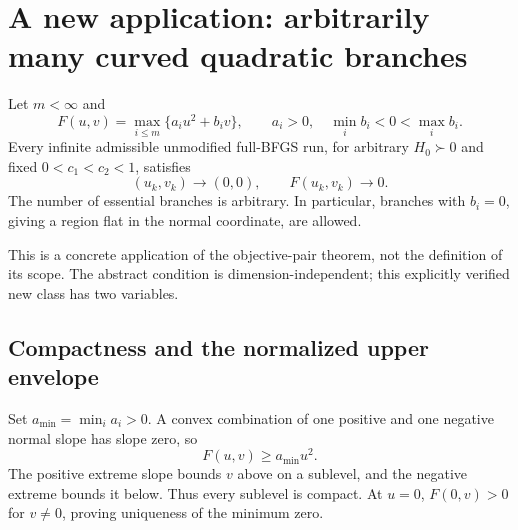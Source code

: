 \begingroup
\providecommand{\R}{}
\renewcommand{\R}{\mathbb R}
\providecommand{\tr}{}
\renewcommand{\tr}{\operatorname{tr}}
\providecommand{\diag}{}
\renewcommand{\diag}{\operatorname{diag}}
\providecommand{\Span}{}
\renewcommand{\Span}{\operatorname{span}}
\providecommand{\ip}{}
\renewcommand{\ip}[2]{\langle #1,#2\rangle}
\providecommand{\norm}{}
\renewcommand{\norm}[1]{\lVert #1\rVert}
\providecommand{\T}{}
\renewcommand{\T}{^{\mathsf T}}
\providecommand{\D}{}
\renewcommand{\D}{\mathcal D}
\setcounter{section}{4}
\setcounter{theorem}{1}
\setcounter{lemma}{0}
\setcounter{corollary}{0}
\setcounter{proposition}{0}
\setcounter{remark}{0}
\setcounter{equation}{6}
\section{A new application: arbitrarily many curved quadratic branches}
\begin{theorem}
Let $m<\infty$ and
\[
 F(u,v)=\max_{i\le m}\{a_i u^2+b_i v\},\qquad
 a_i>0,\quad\min_i b_i<0<\max_i b_i.
\]
Every infinite admissible unmodified full-BFGS run, for arbitrary $H_0\succ0$ and fixed $0<c_1<c_2<1$, satisfies
\[
 (u_k,v_k)\to(0,0),\qquad F(u_k,v_k)\to0.
\]
The number of essential branches is arbitrary. In particular, branches with $b_i=0$, giving a region flat in the normal coordinate, are allowed.
\end{theorem}
This is a concrete application of the objective-pair theorem, not the definition of its scope. The abstract condition is dimension-independent; this explicitly verified new class has two variables.

\subsection{Compactness and the normalized upper envelope}
Set $a_{\min}=\min_i a_i>0$. A convex combination of one positive and one negative normal slope has slope zero, so
\[
 F(u,v)\ge a_{\min}u^2.
\]
The positive extreme slope bounds $v$ above on a sublevel, and the negative extreme bounds it below. Thus every sublevel is compact. At $u=0$, $F(0,v)>0$ for $v\ne0$, proving uniqueness of the minimum zero.


